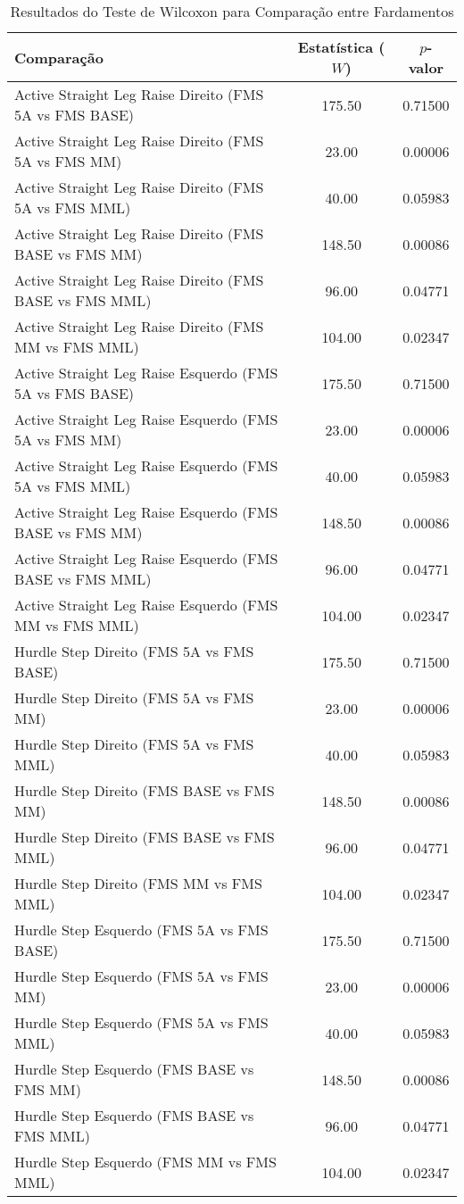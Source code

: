 \begin{table}[H]
    \centering
    \caption{Resultados do Teste de Wilcoxon para Comparação entre Fardamentos}
    \label{tab:wilcoxon}
    \begin{tabular}{lcc}
        \hline
        \textbf{Comparação} & \textbf{Estatística ($W$)} & \textbf{$p$-valor} \\
        \hline
        Active Straight Leg Raise Direito (FMS 5A vs FMS BASE) & 175.50 & 0.71500 \\
        Active Straight Leg Raise Direito (FMS 5A vs FMS MM) & 23.00 & 0.00006 \\
        Active Straight Leg Raise Direito (FMS 5A vs FMS MML) & 40.00 & 0.05983 \\
        Active Straight Leg Raise Direito (FMS BASE vs FMS MM) & 148.50 & 0.00086 \\
        Active Straight Leg Raise Direito (FMS BASE vs FMS MML) & 96.00 & 0.04771 \\
        Active Straight Leg Raise Direito (FMS MM vs FMS MML) & 104.00 & 0.02347 \\
        Active Straight Leg Raise Esquerdo (FMS 5A vs FMS BASE) & 175.50 & 0.71500 \\
        Active Straight Leg Raise Esquerdo (FMS 5A vs FMS MM) & 23.00 & 0.00006 \\
        Active Straight Leg Raise Esquerdo (FMS 5A vs FMS MML) & 40.00 & 0.05983 \\
        Active Straight Leg Raise Esquerdo (FMS BASE vs FMS MM) & 148.50 & 0.00086 \\
        Active Straight Leg Raise Esquerdo (FMS BASE vs FMS MML) & 96.00 & 0.04771 \\
        Active Straight Leg Raise Esquerdo (FMS MM vs FMS MML) & 104.00 & 0.02347 \\
        Hurdle Step Direito (FMS 5A vs FMS BASE) & 175.50 & 0.71500 \\
        Hurdle Step Direito (FMS 5A vs FMS MM) & 23.00 & 0.00006 \\
        Hurdle Step Direito (FMS 5A vs FMS MML) & 40.00 & 0.05983 \\
        Hurdle Step Direito (FMS BASE vs FMS MM) & 148.50 & 0.00086 \\
        Hurdle Step Direito (FMS BASE vs FMS MML) & 96.00 & 0.04771 \\
        Hurdle Step Direito (FMS MM vs FMS MML) & 104.00 & 0.02347 \\
        Hurdle Step Esquerdo (FMS 5A vs FMS BASE) & 175.50 & 0.71500 \\
        Hurdle Step Esquerdo (FMS 5A vs FMS MM) & 23.00 & 0.00006 \\
        Hurdle Step Esquerdo (FMS 5A vs FMS MML) & 40.00 & 0.05983 \\
        Hurdle Step Esquerdo (FMS BASE vs FMS MM) & 148.50 & 0.00086 \\
        Hurdle Step Esquerdo (FMS BASE vs FMS MML) & 96.00 & 0.04771 \\
        Hurdle Step Esquerdo (FMS MM vs FMS MML) & 104.00 & 0.02347 \\
        \hline
    \end{tabular}
\end{table}

